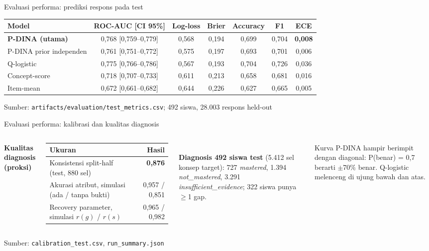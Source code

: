 \documentclass[aspectratio=169,10pt]{beamer}
\newcommand{\src}[1]{\par\vfill{\tiny\color{midgray}Sumber: #1}}
\begin{document}
\begin{frame}{Evaluasi performa: prediksi respons pada test}
  \centering
  \setlength\figH{3.6cm}
  

  \footnotesize
  \begin{tabular}{@{}lcccccc@{}}
    \toprule
    Model & ROC-AUC [CI 95\%] & Log-loss & Brier & Accuracy & F1 & ECE \\
    \midrule
    \rowcolor{navy!8}\textbf{P-DINA (utama)} & 0,768 [0,759--0,779] & 0,568 & 0,194 & 0,699 & 0,704 & \textbf{0,008} \\
    P-DINA prior independen & 0,761 [0,751--0,772] & 0,575 & 0,197 & 0,693 & 0,701 & 0,006 \\
    Q-logistic & 0,775 [0,766--0,786] & 0,567 & 0,193 & 0,704 & 0,726 & 0,036 \\
    Concept-score & 0,718 [0,707--0,733] & 0,611 & 0,213 & 0,658 & 0,681 & 0,016 \\
    Item-mean & 0,672 [0,661--0,682] & 0,644 & 0,226 & 0,627 & 0,665 & 0,005 \\
    \bottomrule
  \end{tabular}
  \src{\texttt{artifacts/evaluation/test\_metrics.csv}; 492 siswa, 28.003 respons held-out}
\end{frame}

\begin{frame}{Evaluasi performa: kalibrasi dan kualitas diagnosis}
  \begin{columns}[T]
    \setlength\figH{5.6cm}
    
    \footnotesize
    \textbf{Kualitas diagnosis (proksi)}\\[3pt]
    \begin{tabularx}{\linewidth}{@{}L r@{}}
      \toprule
      Ukuran & Hasil \\
      \midrule
      Konsistensi split-half (test, 880 sel) & \textbf{0,876} \\
      Akurasi atribut, simulasi (ada / tanpa bukti) & 0,957 / 0,851 \\
      Recovery parameter, simulasi $r(g)$ / $r(s)$ & 0,965 / 0,982 \\
      \bottomrule
    \end{tabularx}\\[4pt]
    \textbf{Diagnosis 492 siswa test} (5.412 sel konsep target): 727 \emph{mastered}, 1.394 \emph{not\_mastered},
    3.291 \emph{insufficient\_evidence}; 322 siswa punya $\ge$1 gap.\\[4pt]
    \begin{infobox}
      Kurva P-DINA hampir berimpit dengan diagonal: P(benar) = 0,7 berarti $\pm$70\% benar.
      Q-logistic melenceng di ujung bawah dan atas.
    \end{infobox}
  \end{columns}
  \src{\texttt{calibration\_test.csv}, \texttt{run\_summary.json}}
\end{frame}
\end{document}
